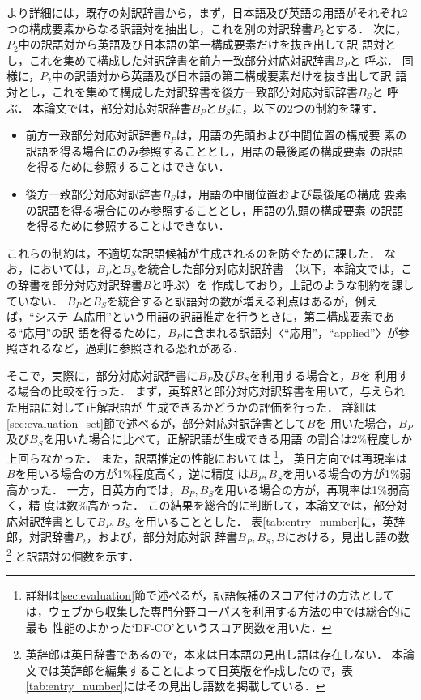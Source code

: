 \documentclass[japanese]{jnlp_1.3a}
\begin{document}
より詳細には，既存の対訳辞書から，まず，日本語及び英語の用語がそれぞれ2
つの構成要素からなる訳語対を抽出し，これを別の対訳辞書$P_2$とする．
次に，$P_2$中の訳語対から英語及び日本語の第一構成要素だけを抜き出して訳
語対とし，これを集めて構成した対訳辞書を前方一致部分対応対訳辞書$B_P$と
呼ぶ．
同様に，$P_2$中の訳語対から英語及び日本語の第二構成要素だけを抜き出して訳
語対とし，これを集めて構成した対訳辞書を後方一致部分対応対訳辞書$B_S$と
呼ぶ．
本論文では，部分対応対訳辞書$B_P$と$B_S$に，以下の2つの制約を課す．
\begin{itemize}
 \item 前方一致部分対応対訳辞書$B_P$は，用語の先頭および中間位置の構成要
       素の訳語を得る場合にのみ参照することとし，用語の最後尾の構成要素
       の訳語を得るために参照することはできない．
 \item 後方一致部分対応対訳辞書$B_S$は，用語の中間位置および最後尾の構成
       要素の訳語を得る場合にのみ参照することとし，用語の先頭の構成要素
       の訳語を得るために参照することはできない．
\end{itemize}
これらの制約は，不適切な訳語候補が生成されるのを防ぐために課した．
なお，\cite{Fujii00}においては，$B_P$と$B_S$を統合した部分対応対訳辞書
（以下，本論文では，この辞書を部分対応対訳辞書$B$と呼ぶ）を
作成しており，上記のような制約を課していない．
$B_P$と$B_S$を統合すると訳語対の数が増える利点はあるが，例えば，“システ
ム応用”という用語の訳語推定を行うときに，第二構成要素である“応用”の訳
語を得るために，$B_P$に含まれる訳語対〈“応用”，``applied''〉が参照されるなど，過剰に参照される恐れがある．

そこで，実際に，部分対応対訳辞書に$B_P$及び$B_S$を利用する場合と，$B$を
利用する場合の比較を行った．
まず，英辞郎と部分対応対訳辞書を用いて，与えられた用語に対して正解訳語が
生成できるかどうかの評価を行った．
詳細は\ref{sec:evaluation_set}節で述べるが，部分対応対訳辞書として$B$を
用いた場合，$B_P$及び$B_S$を用いた場合に比べて，正解訳語が生成できる用語
の割合は2\%程度しか上回らなかった．
また，訳語推定の性能においては
\footnote{
詳細は\ref{sec:evaluation}節で述べるが，訳語候補のスコア付けの方法として
は，ウェブから収集した専門分野コーパスを利用する方法の中では総合的に最も
性能のよかった`DF-CO'というスコア関数を用いた．
}，
英日方向では再現率は$B$を用いる場合の方が1\%程度高く，逆に精度
は$B_P, B_S$を用いる場合の方が1\%弱高かった．
一方，日英方向では，$B_P, B_S$を用いる場合の方が，再現率は1\%弱高く，精
度は数\%高かった．
この結果を総合的に判断して，本論文では，部分対応対訳辞書として$B_P, B_S$
を用いることとした．
表\ref{tab:entry_number}に，英辞郎，対訳辞書$P_2$，および，部分対応対訳
辞書$B_P, B_S, B$における，見出し語の数
\footnote{英辞郎は英日辞書であるので，本来は日本語の見出し語は存在しない．
本論文では英辞郎を編集することによって日英版を作成したので，表
\ref{tab:entry_number}にはその見出し語数を掲載している．}
と訳語対の個数を示す．
\end{document}
